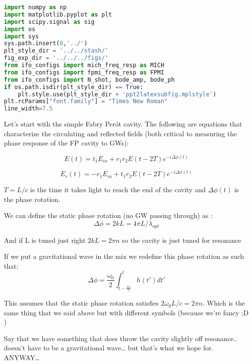 \begin{spacing}{1} \begin{lstlisting}[frame=single, language=Python]
import numpy as np 
import matplotlib.pyplot as plt
import scipy.signal as sig
import os
import sys
sys.path.insert(0,'../')
plt_style_dir = '../../stash/'
fig_exp_dir = '../../../figs/'
from ifo_configs import mich_freq_resp as MICH
from ifo_configs import fpmi_freq_resp as FPMI
from ifo_configs import N_shot, bode_amp, bode_ph
if os.path.isdir(plt_style_dir) == True:
    plt.style.use(plt_style_dir + 'ppt2latexsubfig.mplstyle')
plt.rcParams["font.family"] = "Times New Roman"
line_width=7.5
\end{lstlisting} \end{spacing}

Let's start with the simple Fabry Perót cavity. The following are
equations that characterize the circulating and reflected fields (both
critical to measuring the phase response of the FP cavity to GWs):

\begin{equation}
E(t) = t_1 E_{in} + r_1 r_2 E(t - 2T) e^{-i \Delta \phi(t)} 
\end{equation}

\begin{equation}
E_r(t) = -r_1 E_{in} + t_1 r_2 E(t - 2T) e^{-i \Delta \phi(t)}
\end{equation}

\(T = L/c\) is the time it takes light to reach the end of the cavity
and \(\Delta \phi(t)\) is the phase rotation.

We can define the static phase rotation (no GW passing through) as :
\begin{equation}\Delta \phi = 2kL = 4 \pi L /\lambda_{opt}  \end{equation}

And if L is tuned just right \(2kL = 2 \pi n\) so the cavity is just
tuned for resonance

If we put a gravitational wave in the mix we redefine this phase
rotation as such that:
\begin{equation}\Delta \phi =  \frac{\omega_0}{2} \int_{t-\frac{2L}{c}}^{t} h(t')dt' \end{equation}

This assumes that the static phase rotation satisfies
\(2\omega_0L/c = 2 \pi n\). Which is the same thing that we said above
but with different symbols (because we're fancy ;D )

Say that we have something that does throw the cavity slightly off
resonance.. doesn't have to be a gravitational wave\ldots{} but that's
what we hope for. ANYWAY\ldots{}

